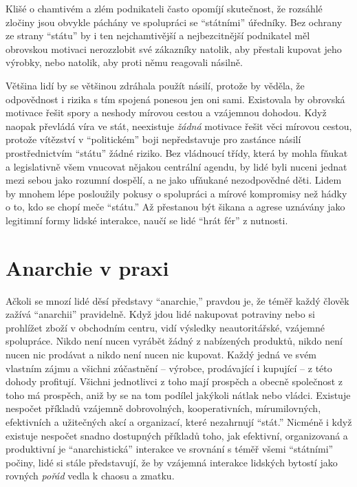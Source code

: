 \documentclass{book}
\begin{document}
Klišé o chamtivém a zlém podnikateli často opomíjí skutečnost, že rozsáhlé zločiny jsou obvykle páchány ve spolupráci se \enquote{státními} úředníky. Bez ochrany ze strany \enquote{státu} by i ten nejchamtivější a nejbezcitnější podnikatel měl obrovskou motivaci nerozzlobit své zákazníky natolik, aby přestali kupovat jeho výrobky, nebo natolik, aby proti němu reagovali násilně.

Většina lidí by se většinou zdráhala použít násilí, protože by věděla, že odpovědnost i rizika s tím spojená ponesou jen oni sami. Existovala by obrovská motivace řešit spory a neshody mírovou cestou a vzájemnou dohodou. Když naopak převládá víra ve stát, neexistuje \emph{žádná} motivace řešit věci mírovou cestou, protože vítězství v \enquote{politickém} boji nepředstavuje pro zastánce násilí prostřednictvím \enquote{státu} žádné riziko. Bez vládnoucí třídy, která by mohla fňukat a legislativně všem vnucovat nějakou centrální agendu, by lidé byli nuceni jednat mezi sebou jako rozumní dospělí, a ne jako ufňukané nezodpovědné děti. Lidem by mnohem lépe posloužily pokusy o spolupráci a mírové kompromisy než hádky o to, kdo se chopí meče \enquote{státu.} Až přestanou být šikana a agrese uznávány jako legitimní formy lidské interakce, naučí se lidé \enquote{hrát fér} z nutnosti.

\section{Anarchie v praxi}

Ačkoli se mnozí lidé děsí představy \enquote{anarchie,} pravdou je, že téměř každý člověk zažívá \enquote{anarchii} pravidelně. Když jdou lidé nakupovat potraviny nebo si prohlížet zboží v obchodním centru, vidí výsledky neautoritářské, vzájemné spolupráce. Nikdo není nucen vyrábět žádný z nabízených produktů, nikdo není nucen nic prodávat a nikdo není nucen nic kupovat. Každý jedná ve svém vlastním zájmu a všichni zúčastnění -- výrobce, prodávající i kupující -- z této dohody profitují. Všichni jednotlivci z toho mají prospěch a obecně společnost z toho má prospěch, aniž by se na tom podílel jakýkoli nátlak nebo vládci. Existuje nespočet příkladů vzájemně dobrovolných, kooperativních, mírumilovných, efektivních a užitečných akcí a organizací, které nezahrnují \enquote{stát.} Nicméně i když existuje nespočet snadno dostupných příkladů toho, jak efektivní, organizovaná a produktivní je \enquote{anarchistická} interakce ve srovnání s téměř všemi \enquote{státními} počiny, lidé si stále představují, že by vzájemná interakce lidských bytostí jako rovných \emph{pořád} vedla k chaosu a zmatku.
\end{document}
